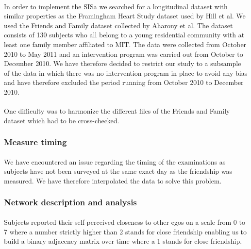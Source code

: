 \documentclass[11pt]{article}
\begin{document}
\paragraph{}
In order to implement the SISa we searched for a longitudinal dataset with similar properties as the Framingham Heart Study dataset used by Hill et al. We used the Friends and Family dataset collected by Aharony et al. The dataset consists of 130 subjects who all belong to a young residential community with at least one family member affiliated to MIT. The data were collected from October 2010 to May 2011 and an intervention program was carried out from October to December 2010. We have therefore decided to restrict our study to a subsample of the data in which there was no intervention program in place to avoid any bias and have therefore excluded the period running from October 2010 to December 2010. 

\paragraph{}

One difficulty was to harmonize the different files of the Friends and Family dataset which had to be cross-checked.

\subsubsection{Measure timing}
\paragraph{}
We have encountered an issue regarding the timing of the examinations as subjects have not been surveyed at the same exact day as the friendship was measured. We have therefore interpolated the data to solve this problem.

\subsubsection{Network description and analysis}
\paragraph{}
Subjects reported their self-perceived closeness to other egos on a scale from 0 to 7 where a number strictly higher than 2 stands for close friendship enabling us to build a binary adjacency matrix over time where a 1 stands for close friendship.

\paragraph{}
\end{document}
